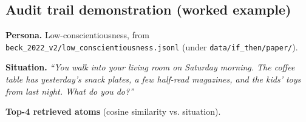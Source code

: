 \subsection{Audit trail demonstration (worked example)}
\label{app:A.3}

\textbf{Persona.} Low-conscientiousness, from \texttt{beck\_\allowbreak{}2022\_\allowbreak{}v2/\allowbreak{}low\_\allowbreak{}conscientiousness.jsonl} (under \texttt{data/\allowbreak{}if\_\allowbreak{}then/\allowbreak{}paper/\allowbreak{}}).

\textbf{Situation.} \textit{``You walk into your living room on Saturday morning. The coffee table has yesterday's snack plates, a few half-read magazines, and the kids' toys from last night. What do you do?''}

\textbf{Top-4 retrieved atoms} (cosine similarity vs. situation).

\begin{table}[t]
\centering
{}
\caption{Worked example of the audit trail. Top-4 retrieved atoms for the situation above under the low-conscientiousness persona, with cosine similarity to the situation.}
\label{tab:audit-trail}
\end{table}

